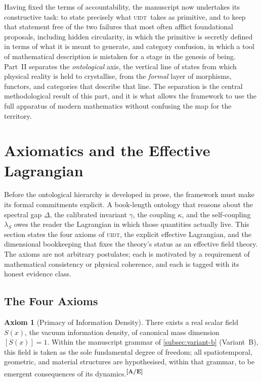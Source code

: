 \documentclass[12pt,a4paper,twoside]{article}
\theoremstyle{plain}
\theoremstyle{definition}
\newtheorem{axiom}{Axiom}
\theoremstyle{remark}
\newcommand{\UIDT}{\textsc{uidt}}
\newcommand{\catmark}[1]{\textsuperscript{\textsf{\textbf{[#1]}}}}
\newcommand{\Sx}{S(x)}
\begin{document}
\noindent Having fixed the terms of accountability, the manuscript now undertakes its constructive task: to state precisely what \UIDT\ takes as primitive, and to keep that statement free of the two failures that most often afflict foundational proposals, including hidden circularity, in which the primitive is secretly defined in terms of what it is meant to generate, and category confusion, in which a tool of mathematical description is mistaken for a stage in the genesis of being. Part~II separates the \emph{ontological} axis, the vertical line of states from which physical reality is held to crystallise, from the \emph{formal} layer of morphisms, functors, and categories that describe that line. The separation is the central methodological result of this part, and it is what allows the framework to use the full apparatus of modern mathematics without confusing the map for the territory.

\section{Axiomatics and the Effective Lagrangian}
\label{sec:axiomatics}

\noindent Before the ontological hierarchy is developed in prose, the framework must make its formal commitments explicit. A book-length ontology that reasons about the spectral gap $\Delta$, the calibrated invariant $\gamma$, the coupling $\kappa$, and the self-coupling $\lambda_S$ owes the reader the Lagrangian in which those quantities actually live. This section states the four axioms of \UIDT, the explicit effective Lagrangian, and the dimensional bookkeeping that fixes the theory's status as an effective field theory. The axioms are not arbitrary postulates; each is motivated by a requirement of mathematical consistency or physical coherence, and each is tagged with its honest evidence class.

\subsection{The Four Axioms}
\label{subsec:four-axioms}

\begin{axiom}[Primacy of Information Density]
\label{ax:primacy}
There exists a real scalar field $\Sx$, the vacuum information density, of canonical mass dimension $[\Sx]=1$. Within the manuscript grammar of \cref{subsec:variant-b} (Variant~B), this field is taken as the sole fundamental degree of freedom; all spatiotemporal, geometric, and material structures are hypothesised, within that grammar, to be emergent consequences of its dynamics.\catmark{A/E}
\end{axiom}
\end{document}
